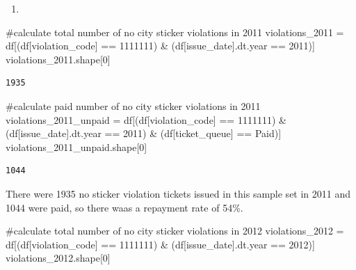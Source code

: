 \documentclass[
]{article}
\newenvironment{Shaded}{\begin{snugshade}}{\end{snugshade}}
\newcommand{\CommentTok}[1]{\textcolor[rgb]{0.37,0.37,0.37}{#1}}
\newcommand{\DecValTok}[1]{\textcolor[rgb]{0.68,0.00,0.00}{#1}}
\newcommand{\NormalTok}[1]{\textcolor[rgb]{0.00,0.23,0.31}{#1}}
\newcommand{\OperatorTok}[1]{\textcolor[rgb]{0.37,0.37,0.37}{#1}}
\newcommand{\StringTok}[1]{\textcolor[rgb]{0.13,0.47,0.30}{#1}}
\providecommand{\tightlist}{%
  \setlength{\itemsep}{0pt}\setlength{\parskip}{0pt}}\usepackage{longtable,booktabs,array}
\begin{document}
\begin{enumerate}
\def\labelenumi{\arabic{enumi}.}
\setcounter{enumi}{3}
\tightlist
\item
\end{enumerate}

\begin{Shaded}
\begin{Highlighting}[]
\CommentTok{\#calculate total number of no city sticker violations in 2011}
\NormalTok{violations\_2011 }\OperatorTok{=}\NormalTok{ df[(df[}\StringTok{\textquotesingle{}violation\_code\textquotesingle{}}\NormalTok{] }\OperatorTok{==} \StringTok{\textquotesingle{}1111111\textquotesingle{}}\NormalTok{) }\OperatorTok{\&}\NormalTok{ (df[}\StringTok{\textquotesingle{}issue\_date\textquotesingle{}}\NormalTok{].dt.year }\OperatorTok{==} \DecValTok{2011}\NormalTok{)]}
\NormalTok{violations\_2011.shape[}\DecValTok{0}\NormalTok{]}
\end{Highlighting}
\end{Shaded}

\begin{verbatim}
1935
\end{verbatim}

\begin{Shaded}
\begin{Highlighting}[]
\CommentTok{\#calculate paid number of no city sticker violations in 2011}
\NormalTok{violations\_2011\_unpaid }\OperatorTok{=}\NormalTok{ df[(df[}\StringTok{\textquotesingle{}violation\_code\textquotesingle{}}\NormalTok{] }\OperatorTok{==} \StringTok{\textquotesingle{}1111111\textquotesingle{}}\NormalTok{) }\OperatorTok{\&}\NormalTok{ (df[}\StringTok{\textquotesingle{}issue\_date\textquotesingle{}}\NormalTok{].dt.year }\OperatorTok{==} \DecValTok{2011}\NormalTok{) }\OperatorTok{\&}\NormalTok{ (df[}\StringTok{\textquotesingle{}ticket\_queue\textquotesingle{}}\NormalTok{] }\OperatorTok{==} \StringTok{\textquotesingle{}Paid\textquotesingle{}}\NormalTok{)]}
\NormalTok{violations\_2011\_unpaid.shape[}\DecValTok{0}\NormalTok{]}
\end{Highlighting}
\end{Shaded}

\begin{verbatim}
1044
\end{verbatim}

There were 1935 no sticker violation tickets issued in this sample set
in 2011 and 1044 were paid, so there waas a repayment rate of 54\%.

\begin{Shaded}
\begin{Highlighting}[]
\CommentTok{\#calculate total number of no city sticker violations in 2012}
\NormalTok{violations\_2012 }\OperatorTok{=}\NormalTok{ df[(df[}\StringTok{\textquotesingle{}violation\_code\textquotesingle{}}\NormalTok{] }\OperatorTok{==} \StringTok{\textquotesingle{}1111111\textquotesingle{}}\NormalTok{) }\OperatorTok{\&}\NormalTok{ (df[}\StringTok{\textquotesingle{}issue\_date\textquotesingle{}}\NormalTok{].dt.year }\OperatorTok{==} \DecValTok{2012}\NormalTok{)]}
\NormalTok{violations\_2012.shape[}\DecValTok{0}\NormalTok{]}
\end{Highlighting}
\end{Shaded}
\end{document}
